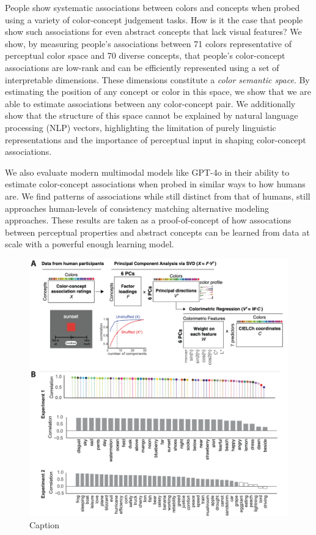 \documentclass{Dissertate}
\begin{document}
People show systematic associations between colors and concepts when probed using a variety of color-concept judgement tasks.
How is it the case that people show such associations for even abstract concepts that lack visual features?
We show, by measuring people's associations between 71 colors representative of perceptual color space and 70 diverse concepts, that people's color-concept associations are low-rank and can be efficiently represented using a set of interpretable dimensions.
These dimensions constitute a \textit{color semantic space}.
By estimating the position of any concept or color in this space, we show that we are able to estimate associations between any color-concept pair.
We additionally show that the structure of this space cannot be explained by natural language processing (NLP) vectors, highlighting the limitation of purely linguistic representations and the importance of perceptual input in shaping color-concept associations.

We also evaluate modern multimodal models like GPT-4o in their ability to estimate color-concept associations when probed in similar ways to how humans are. 
We find patterns of associations while still distinct from that of humans, still approaches human-levels of consistency matching alternative modeling approaches.
These results are taken as a proof-of-concept of how assocations between perceptual properties and abstract concepts can be learned from data at scale with a powerful enough learning model.

\begin{figure}[htpb!]
    \centering
    \includegraphics[width=.8\linewidth]{proposal/figures/chap1.pdf}
    \caption{Caption}
    \label{fig:enter-label}
\end{figure}
\end{document}
